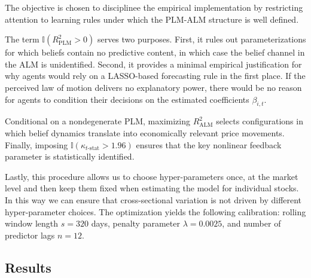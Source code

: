 \documentclass[11pt]{article}
\begin{document}
The objective is chosen to disciplinee the empirical implementation by restricting
attention to learning rules under which the PLM-ALM structure is well defined.

The term \(\mathbb{I}(R^2_{\text{PLM}}>0)\) serves two purposes. First, it rules out
parameterizations for which beliefs contain no predictive content, in which case the
belief channel in the ALM is unidentified. Second, it provides a minimal empirical
justification for why agents would rely on a LASSO-based forecasting rule in the first
place. If the perceived law of motion delivers no explanatory power, there would be no reason
for agents to condition their decisions on the estimated coefficients \(\beta_{i,t}\).

Conditional on a nondegenerate PLM, maximizing \(R^2_{\text{ALM}}\) selects configurations
in which belief dynamics translate into economically relevant price movements. Finally,
imposing \(\mathbb{I}(\kappa_{t\text{-stat}}>1.96)\) ensures that the key nonlinear feedback
parameter is statistically identified.

Lastly, this procedure allows us to choose hyper-parameters once, at the market level and then keep them 
fixed when estimating the model for individual stocks.
In this way we can ensure that cross-sectional variation is not driven by different hyper-parameter choices.
The optimization yields the following calibration: rolling window length \(s = 320\) days, penalty parameter \(\lambda = 0.0025\), and number of predictor lags \(n = 12\).


\subsection{Results}
\end{document}
